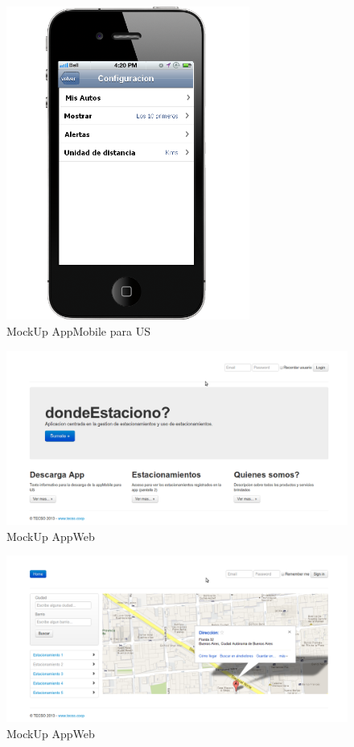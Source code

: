 \documentclass[spanish, DIV=calc, paper=a4, fontsize=11pt, twocolumn]{scrartcl}	 %
\begin{document}
\begin{figure}[htp]
\includegraphics[width=8.0cm,height=\paperheight,keepaspectratio]{img/mockUpAppMobileUS/configuracion.png}%
\caption{MockUp AppMobile para US}
\label{dash-1}
\end{figure}


\begin{figure}[htp]
\includegraphics[width=18.0cm,height=\paperheight,keepaspectratio]{img/mockUpAppWeb/appWeb-01-01.png}%
\caption{MockUp AppWeb}
\label{dash-1}
\end{figure}


\begin{figure}[htp]
\includegraphics[width=18.0cm,height=\paperheight,keepaspectratio]{img/mockUpAppWeb/appWeb-02-02.png}%
\caption{MockUp AppWeb}
\label{dash-1}
\end{figure}
\end{document}
